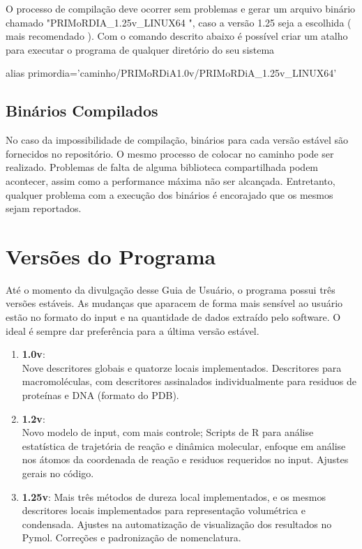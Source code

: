 \documentclass[a4paper,11pt]{refart}
\begin{document}
O processo de compilação deve ocorrer sem problemas e gerar um arquivo binário chamado "PRIMoRDIA\_1.25v\_LINUX64 ", caso a versão 1.25 seja a escolhida ( mais recomendado ).
Com o comando descrito abaixo é possível criar um atalho para executar o programa de qualquer diretório do seu sistema

\hspace*{-\leftmarginwidth}
\begin{minipage}{\fullwidth}
\begin{commandshell}
alias primordia='caminho/PRIMoRDiA1.0v/PRIMoRDiA\_1.25v\_LINUX64'
\end{commandshell}
\end{minipage}


\subsection{Binários Compilados} 

No caso da impossibilidade de compilação, binários para cada versão estável são fornecidos no repositório. O mesmo processo de colocar no caminho pode ser realizado. Problemas de falta de alguma biblioteca compartilhada podem acontecer, assim como a performance máxima não ser alcançada. Entretanto, qualquer problema com a execução dos binários é encorajado que os mesmos sejam reportados. 

\newpage
\section{Versões do Programa}

Até o momento da divulgação desse Guia de Usuário, o programa possui três versões estáveis. 
As mudanças que aparacem de forma mais sensível ao usuário estão no formato do input e na quantidade de dados extraído pelo software. O ideal é sempre dar preferência para a última versão estável. 

\begin{enumerate}
	\item \textbf{1.0v}:\\
	Nove descritores globais e quatorze locais implementados. Descritores para macromoléculas, com descritores assinalados individualmente para residuos de proteínas e DNA (formato do PDB).  
	\item \textbf{1.2v}:
	\\ Novo modelo de input, com mais controle; Scripts de R para análise estatística de trajetória de reação e dinâmica molecular, enfoque em análise nos átomos da coordenada de reação e residuos requeridos no input. Ajustes gerais no código. 
	\item \textbf{1.25v}: Mais três métodos de dureza local implementados, e os mesmos descritores locais implementados para representação volumétrica e condensada. Ajustes na automatização de visualização dos resultados no Pymol. Correções e padronização de nomenclatura. 
\end{enumerate}
\end{document}

